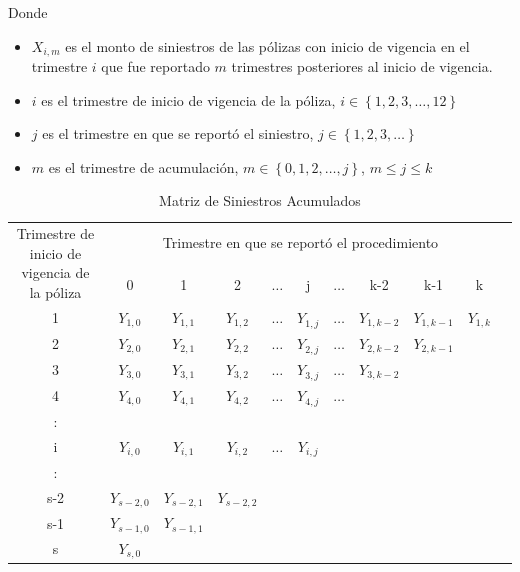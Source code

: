 \documentclass[11pt,twoside,openright,spanish]{report}
\numberwithin{equation}{chapter}
\numberwithin{figure}{chapter}
\numberwithin{table}{chapter}
\begin{document}
	Donde
	
	\begin{itemize}
	\setlength\itemsep{-0.5em}
		\item ${X}_{i,m}$ es el monto de siniestros de las pólizas con inicio de vigencia en el trimestre $i$ que fue reportado $m$ trimestres posteriores al inicio de vigencia.
		\item $i$ es el trimestre de inicio de vigencia de la póliza, $i\in \left\{1,2,3,\dots ,12\right\}$
		\item $j$ es el trimestre en que se reportó el siniestro,  $j\in \left\{1,2,3,\dots\right\}$
		\item $m$ es el trimestre de acumulación, $m\in \left\{0,1,2,\dots ,j\right\}$, $m\le j\le k$
	\end{itemize} 
	
	\begin{table}[ht]
	\centering
		
	\begin{tabularx}{\linewidth}{c|cccccccccc}
		\multirow{2}{4cm}{Trimestre de inicio de vigencia de la póliza}&\multicolumn{9}{c}{ Trimestre en que se reportó el procedimiento} \\
		& 0  & 1 & 2 & $ \dots $ & j & $\dots $ & k-2 & k-1 &  k \\
		\midrule
		1      &  $Y_{1,0}^{}$ & $Y_{1,1}^{}$ & $Y_{1,2}^{}$ & $ \dots $ & $Y_{1,j}^{}$ & $ \dots $ & $Y_{1,k-2}^{}$ & $Y_{1,k-1}^{}$ & $Y_{1,k}^{}$ \\
		2      &  $Y_{2,0}^{}$ & $Y_{2,1}^{}$ & $Y_{2,2}^{}$ & $ \dots $ & $Y_{2,j}^{}$ & $ \dots $ & $Y_{2,k-2}^{}$ & $Y_{2,k-1}^{}$ & \\
		3      &  $Y_{3,0}^{}$ & $Y_{3,1}^{}$ & $Y_{3,2}^{}$ & $ \dots $ & $Y_{3,j}^{}$ & $ \dots $ & $Y_{3,k-2}^{}$ & & \\
		4      &  $Y_{4,0}^{}$ & $Y_{4,1}^{}$ & $Y_{4,2}^{}$ & $ \dots $ & $Y_{4,j}^{}$ & $ \dots $ & & & \\
		:      & & & & & & & & &\\
		i      &  $Y_{i,0}^{}$ & $Y_{i,1}^{}$ & $Y_{i,2}^{}$ & $ \dots $ & $Y_{i,j}^{}$ & & & & \\
		:      & & & & & & & & & \\
		s-2      &  $Y_{s-2,0}^{}$ & $Y_{s-2,1}^{}$ & $Y_{s-2,2}^{}$ & & & & & & \\
		s-1      &  $Y_{s-1,0}^{}$ & $Y_{s-1,1}^{}$ & & & & & & & \\
		s      &  $Y_{s,0}^{}$ & & & & & & & & \\
	\end{tabularx}
\caption{Matriz de Siniestros Acumulados}
\label{matrix2}
	\end{table} 
	
\end{document}
